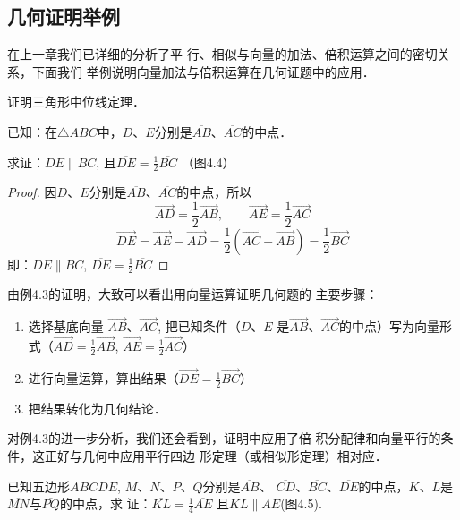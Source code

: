 \subsection{几何证明举例}
 在上一章我们已详细的分析了平
行、相似与向量的加法、倍积运算之间的密切关系，下面我们
举例说明向量加法与倍积运算在几何证题中的应用．


\begin{example}
    证明三角形中位线定理．

已知：在$\triangle ABC$中，$D$、$E$分别是$\overline{AB}$、$\overline{AC}$的中点．

求证：$DE\parallel BC$, 且$\overline{DE}=\frac{1}{2}\overline{BC}$ （图4.4）
\end{example}

\begin{figure}[htp]
    \centering
{}
    \caption{}
\end{figure}

\begin{proof}
    因$D$、$E$分别是$\overline{AB}$、$\overline{AC}$的中点，所以
\[\Vec{AD}=\frac{1}{2} \Vec{AB},\qquad \Vec{AE}=\frac{1}{2}\Vec{AC}\]
\[\Vec{DE}=\Vec{AE}-\Vec{AD}=\frac{1}{2}\left(\Vec{AC}-\Vec{AB}\right)=\frac{1}{2}\Vec{BC}\]
即：$DE\parallel BC$,  $\overline{DE}=\frac{1}{2}\overline{BC}$
\end{proof}

由例4.3的证明，大致可以看出用向量运算证明几何题的
主要步骤：
\begin{enumerate}
\item 选择基底向量
$\Vec{AB}$、$\Vec{AC}$, 
把已知条件（$D$、$E$
是$\Vec{AB}$、$\Vec{AC}$的中点）写为向量形式（$\Vec{AD}=\frac{1}{2}\Vec{AB}$, $\Vec{AE}=\frac{1}{2}\Vec{AC}$）
\item 进行向量运算，算出结果（$\Vec{DE}=\frac{1}{2}\Vec{BC}$）
\item 把结果转化为几何结论．
\end{enumerate}

对例4.3的进一步分析，我们还会看到，证明中应用了倍
积分配律和向量平行的条件，这正好与几何中应用平行四边
形定理（或相似形定理）相对应．

\begin{example}
 已知五边形$ABCDE$, $M$、$N$、$P$、$Q$分别是$\overline{AB}$、
 $\overline{CD}$、$\overline{BC}$、$\overline{DE}$的中点，$K$、$L$是$\overline{MN}$与$\overline{PQ}$的中点，求
证：$\overline{KL}=\frac{1}{4}\overline{AE}$ 且$KL\parallel AE$(图4.5).
\end{example}

